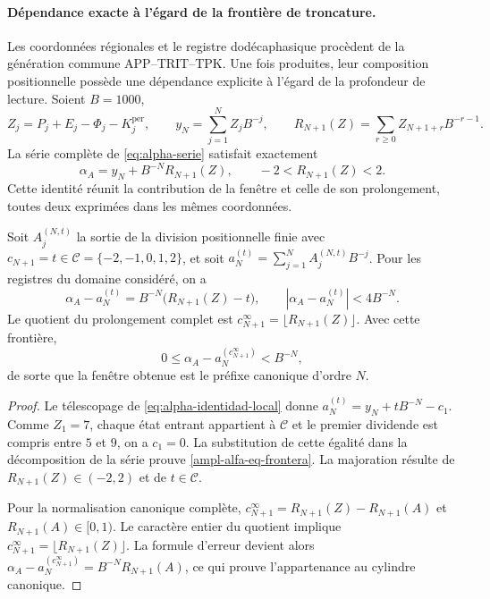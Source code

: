 \paragraph{Dépendance exacte à l'égard de la frontière de troncature.}
\label{ampl-alfa-frontera-exacta}
Les coordonnées régionales et le registre dodécaphasique procèdent de la
génération commune APP--TRIT--TPK. Une fois produites, leur composition
positionnelle possède une dépendance explicite à l'égard de la profondeur
de lecture. Soient $B=1000$,
\[
 Z_j=P_j+E_j-\Phi_j-K_j^{\mathrm{per}},\qquad
 y_N=\sum_{j=1}^{N}Z_jB^{-j},\qquad
 R_{N+1}(Z)=\sum_{r\geq0}Z_{N+1+r}B^{-r-1}.
\]
La série complète de \eqref{eq:alpha-serie} satisfait exactement
\[
 \alpha_A=y_N+B^{-N}R_{N+1}(Z),\qquad
 -2<R_{N+1}(Z)<2.
\]
Cette identité réunit la contribution de la fenêtre et celle de son
prolongement, toutes deux exprimées dans les mêmes coordonnées.

\begin{proposition}
\label{ampl-alfa-prop-frontera}
Soit $A_j^{(N,t)}$ la sortie de la division positionnelle finie avec
$c_{N+1}=t\in\mathcal C=\{-2,-1,0,1,2\}$, et soit
$a_N^{(t)}=\sum_{j=1}^{N}A_j^{(N,t)}B^{-j}$. Pour les registres du
domaine considéré, on a
\begin{equation}
 \alpha_A-a_N^{(t)}
 =B^{-N}\bigl(R_{N+1}(Z)-t\bigr),
 \qquad
 |\alpha_A-a_N^{(t)}|<4B^{-N}.
 \label{ampl-alfa-eq-frontera}
\end{equation}
Le quotient du prolongement complet est
$c_{N+1}^{\infty}=\lfloor R_{N+1}(Z)\rfloor$. Avec cette frontière,
\[
 0\leq\alpha_A-a_N^{(c_{N+1}^{\infty})}<B^{-N},
\]
de sorte que la fenêtre obtenue est le préfixe canonique d'ordre $N$.
\end{proposition}
\begin{proof}
Le télescopage de \eqref{eq:alpha-identidad-local} donne
$a_N^{(t)}=y_N+tB^{-N}-c_1$. Comme $Z_1=7$, chaque état entrant
appartient à $\mathcal C$ et le premier dividende est compris entre $5$ et $9$,
on a $c_1=0$. La substitution de cette égalité dans la décomposition de la
série prouve \eqref{ampl-alfa-eq-frontera}. La majoration résulte de
$R_{N+1}(Z)\in(-2,2)$ et de $t\in\mathcal C$.

Pour la normalisation canonique complète,
$c_{N+1}^{\infty}=R_{N+1}(Z)-R_{N+1}(A)$ et
$R_{N+1}(A)\in[0,1)$. Le caractère entier du quotient implique
$c_{N+1}^{\infty}=\lfloor R_{N+1}(Z)\rfloor$. La formule d'erreur
devient alors
$\alpha_A-a_N^{(c_{N+1}^{\infty})}=B^{-N}R_{N+1}(A)$, ce qui prouve
l'appartenance au cylindre canonique.
\end{proof}

